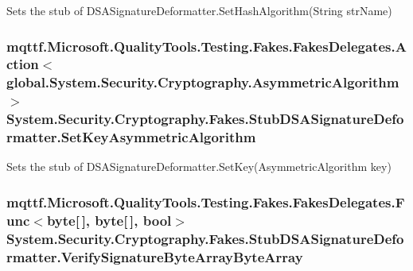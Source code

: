 Sets the stub of D\-S\-A\-Signature\-Deformatter.\-Set\-Hash\-Algorithm(\-String str\-Name)

\hypertarget{class_system_1_1_security_1_1_cryptography_1_1_fakes_1_1_stub_d_s_a_signature_deformatter_a78dfa4304a3842d00b6143bf6741bdea}{
\subsubsection[{Set\-Key\-Asymmetric\-Algorithm}]{\setlength{\rightskip}{0pt plus 5cm}mqttf.\-Microsoft.\-Quality\-Tools.\-Testing.\-Fakes.\-Fakes\-Delegates.\-Action$<$global.\-System.\-Security.\-Cryptography.\-Asymmetric\-Algorithm$>$ System.\-Security.\-Cryptography.\-Fakes.\-Stub\-D\-S\-A\-Signature\-Deformatter.\-Set\-Key\-Asymmetric\-Algorithm}}\label{class_system_1_1_security_1_1_cryptography_1_1_fakes_1_1_stub_d_s_a_signature_deformatter_a78dfa4304a3842d00b6143bf6741bdea}


Sets the stub of D\-S\-A\-Signature\-Deformatter.\-Set\-Key(\-Asymmetric\-Algorithm key)

\hypertarget{class_system_1_1_security_1_1_cryptography_1_1_fakes_1_1_stub_d_s_a_signature_deformatter_abbe7e12792be39ef534465b2025713cd}{
\subsubsection[{Verify\-Signature\-Byte\-Array\-Byte\-Array}]{\setlength{\rightskip}{0pt plus 5cm}mqttf.\-Microsoft.\-Quality\-Tools.\-Testing.\-Fakes.\-Fakes\-Delegates.\-Func$<$byte\mbox{[}$\,$\mbox{]}, byte\mbox{[}$\,$\mbox{]}, bool$>$ System.\-Security.\-Cryptography.\-Fakes.\-Stub\-D\-S\-A\-Signature\-Deformatter.\-Verify\-Signature\-Byte\-Array\-Byte\-Array}}\label{class_system_1_1_security_1_1_cryptography_1_1_fakes_1_1_stub_d_s_a_signature_deformatter_abbe7e12792be39ef534465b2025713cd}


